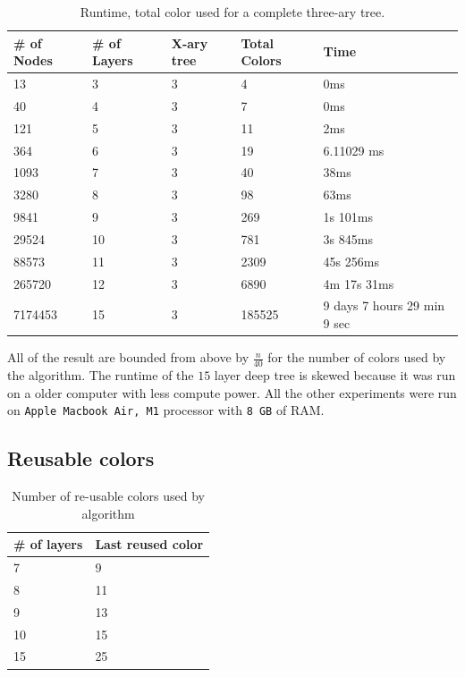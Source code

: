 \documentclass{article}
\theoremstyle{remark}
\begin{document}
\begin{table}[h]
\centering
\begin{tabular}{|l|l|l|l|l|}
\hline
\# of Nodes & \# of Layers & X-ary tree & Total Colors & Time\\
\hline
13 & 3 & 3 & 4 & 0ms \\\hline
40 & 4 & 3 & 7 & 0ms \\\hline
121 & 5 & 3 & 11 & 2ms \\\hline
364 & 6 & 3 & 19 & 6.11029 ms \\\hline
1093 & 7 & 3 & 40 & 38ms \\\hline
3280 & 8 & 3 & 98 & 63ms \\\hline
9841 & 9 & 3 & 269 & 1s 101ms \\\hline
29524 & 10 & 3 & 781 & 3s 845ms \\\hline
88573 & 11 & 3 & 2309 & 45s 256ms \\\hline
265720 & 12 & 3 & 6890 & 4m 17s 31ms \\ \hline
7174453 & 15 & 3 & 185525 & 9 days 7 hours 29 min 9 sec\\
\hline
\end{tabular}
\caption{Runtime, total color used for a complete three-ary tree.}
\end{table}

All of the result are bounded from above by $\frac{n}{40}$ for the number of colors used by the algorithm. The runtime of the $15$ layer deep tree is skewed because it was run on a older computer with less compute power. All the other experiments were run on \texttt{Apple Macbook Air, M1} processor with \texttt{8 GB} of RAM.

\subsection{Reusable colors}

\begin{table}
    \centering
    \begin{tabular}{|l|l|}
        \hline
        \# of layers & Last reused color\\\hline
        7 & 9 \\\hline
        8 & 11\\\hline
        9 & 13\\\hline
        10 & 15\\\hline
        15 & 25\\
        \hline
    \end{tabular}
    \caption{Number of re-usable colors used by algorithm}
\end{table}
\end{document}
